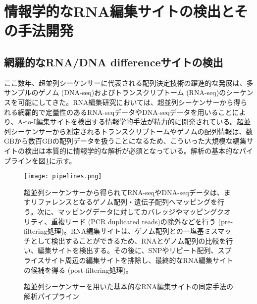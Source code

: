 \section{情報学的なRNA編集サイトの検出とその手法開発}
\subsection{網羅的なRNA/DNA differenceサイトの検出}
ここ数年、超並列シーケンサーに代表される配列決定技術の躍進的な発展は、多サンプルのゲノム (DNA-seq)およびトランスクリプトーム (RNA-seq)のシーケンスを可能にしてきた。RNA編集研究においては、超並列シーケンサーから得られる網羅的で定量性のあるRNA-seqデータやDNA-seqデータを用いることにより、A-to-I編集サイトを検出する情報学的手法が精力的に開発されている。超並列シーケンサーから測定されるトランスクリプトームやゲノムの配列情報は、数GBから数百GBの配列データを扱うことになるため、こういった大規模な編集サイトの検出は本質的に情報学的な解析が必須となっている。解析の基本的なパイプラインを図\ref{fig:pipelines}に示す。
\begin{figure}[!h]
	\begin{center}
		\texttt{[image: pipelines.png]}
	\end{center}
	\caption{超並列シーケンサーを用いた基本的なRNA編集サイトの同定手法の解析パイプライン}
	\begin{flushleft}
		\small{超並列シーケンサーから得られてRNA-seqやDNA-seqデータは、ますリファレンスとなるゲノム配列・遺伝子配列へマッピングを行う。次に、マッピングデータに対してカバレッジやマッピングクオリティ、重複リード (PCR duplicated reads)の除外などを行う (pre-filtering処理)。RNA編集サイトは、ゲノム配列との一塩基ミスマッチとして検出することができるため、RNAとゲノム配列の比較を行い、編集サイトを検出する。その後に、SNPやリピート配列、スプライスサイト周辺の編集サイトを排除し、最終的なRNA編集サイトの候補を得る (post-filtering処理)。}
	\end{flushleft}
	\label{fig:pipelines}
\end{figure}

